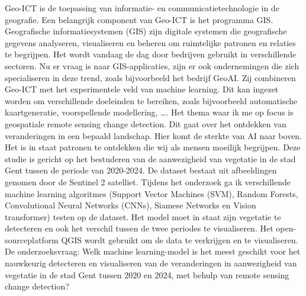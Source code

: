 \textcolor{hogent-purple}{Geo-ICT is de toepassing van informatie- en communicatietechnologie in de geografie. Een belangrijk component van Geo-ICT is het programma GIS.
Geografische informatiesystemen (GIS) zijn digitale systemen die geografische gegevens analyseren, visualiseren en beheren om ruimtelijke 
patronen en relaties te begrijpen. Het wordt vandaag de dag door bedrijven gebruikt in verschillende sectoren. 
Nu er vraag is naar GIS-applicaties, zijn er ook ondernemingen die zich specialiseren in deze trend, zoals bijvoorbeeld het bedrijf GeoAI. 
Zij combineren Geo-ICT met het experimentele veld van machine learning. Dit kan ingezet worden om verschillende doeleinden te bereiken, zoals
bijvoorbeeld automatische kaartgeneratie, voorspellende modellering, \ldots.}
\newline
Het thema waar ik me op focus is geospatiale remote sensing change detection. Dit gaat over het ontdekken van veranderingen in een bepaald landschap.
Hier komt de sterkte van AI naar boven. Het is in staat patronen te ontdekken die wij als mensen moeilijk begrijpen.
Deze studie is gericht op het bestuderen van de aanwezigheid van vegetatie in de stad Gent tussen de periode van 2020-2024. 
De dataset bestaat uit afbeeldingen genomen door de Sentinel 2 satelliet. Tijdens het onderzoek ga ik verschillende machine learning 
algoritmes (Support Vector Machines (SVM), Random Forests, Convolutional Neural Networks (CNNs), Siamese Networks en Vision transformer) 
testen op de dataset. Het model moet in staat zijn vegetatie te detecteren en ook het verschil tussen de twee periodes te visualiseren. 
Het open-sourceplatform QGIS wordt gebruikt om de data te verkrijgen en te visualiseren.
\newline
\textcolor{hogent-yellow}{De onderzoeksvraag: Welk machine learning-model is het meest geschikt voor het nauwkeurig detecteren en visualiseren van de
veranderingen in aanwezigheid van vegetatie in de stad Gent tussen 2020 en 2024, met behulp van remote sensing change detection?}
\newline

